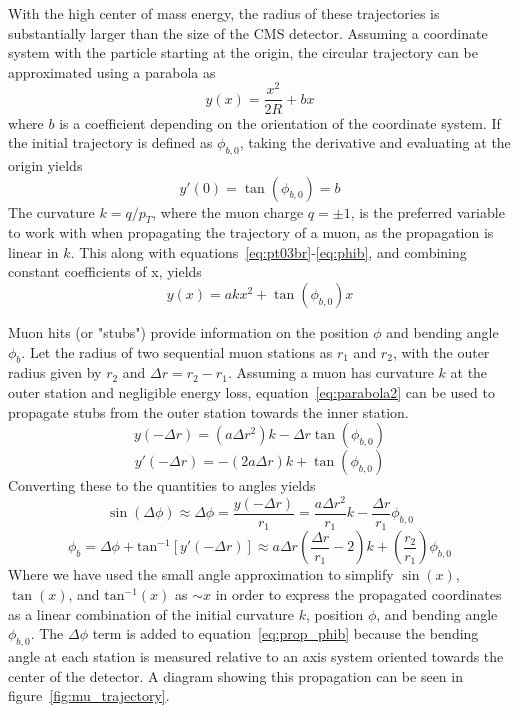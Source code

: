 With the high center of mass energy, the radius of these trajectories is substantially larger than the size of the CMS detector. Assuming a coordinate system with the particle starting at the origin, the circular trajectory can be approximated using a parabola as
\begin{equation}
	\label{eq:parabola1}
	y(x)=\frac{x^2}{2R}+bx
\end{equation}
where $b$ is a coefficient depending on the orientation of the coordinate system. If the initial trajectory is defined as $\phi_{b,0}$, taking the derivative and evaluating at the origin yields
\begin{equation}
	\label{eq:phib}
	y'(0)=\tan(\phi_{b,0})=b
\end{equation}	
The curvature $k=q/p_{T}$, where the muon charge $q=\pm1$, is the preferred variable to work with when propagating the trajectory of a muon, as the propagation is linear in $k$. This along with equations~\ref{eq:pt03br}-\ref{eq:phib}, and combining constant coefficients of x, yields
\begin{equation}
	\label{eq:parabola2}
	y(x)=akx^2+\tan(\phi_{b,0})x
\end{equation}

Muon hits (or "stubs") provide information on the position $\phi$ and bending angle $\phi_b$. Let the radius of two sequential muon stations as $r_1$ and $r_2$, with the outer radius given by $r_2$ and $\Delta r=r_2-r_1$. Assuming a muon has curvature $k$ at the outer station and negligible energy loss, equation~\ref{eq:parabola2} can be used to propagate stubs from the outer station towards the inner station.
\begin{equation}
	y(-\Delta r) = \left(a\Delta r^2\right)k-\Delta r\tan(\phi_{b,0})
\end{equation}
\begin{equation}
	y'(-\Delta r)=-\left(2a\Delta r\right)k+\tan(\phi_{b,0})
\end{equation}
Converting these to the quantities to angles yields
\begin{equation}
	\label{eq:prop_phi}
	\sin(\Delta\phi)\approx\Delta\phi=\frac{y(-\Delta r)}{r_1} = \frac{a\Delta r^2}{r_1}k-\frac{\Delta r}{r_1}\phi_{b,0}
\end{equation}
\begin{equation}
	\label{eq:prop_phib}
	\phi_b=\Delta\phi+\mathrm{tan}^{-1}\left[y'(-\Delta r)\right]\approx a\Delta r\left(\frac{\Delta r}{r_1}-2\right)k+\left(\frac{r_2}{r_1}\right)\phi_{b,0}
\end{equation}
Where we have used the small angle approximation to simplify $\sin(x)$, $\tan(x)$, and $\mathrm{tan}^{-1}(x)$ as $\sim x$ in order to express the propagated coordinates as a linear combination of the initial curvature $k$, position $\phi$, and bending angle $\phi_{b,0}$. The $\Delta\phi$ term is added to equation~\ref{eq:prop_phib} because the bending angle at each station is measured relative to an axis system oriented towards the center of the detector. A diagram showing this propagation can be seen in figure~\ref{fig:mu_trajectory}.

